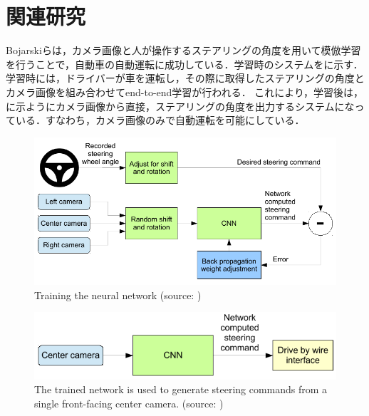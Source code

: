 
\section{関連研究}
     Bojarskiら\cite{bojarski}は，カメラ画像と人が操作するステアリングの角度を用いて模倣学習を行うことで，自動車の自動運転に成功している．学習時のシステムをに示す．学習時には，ドライバーが車を運転し，その際に取得したステアリングの角度とカメラ画像を組み合わせてend-to-end学習が行われる．
     これにより，学習後は，に示ようにカメラ画像から直接，ステアリングの角度を出力するシステムになっている．すなわち，カメラ画像のみで自動運転を可能にしている．
     
     \vspace{0.5cm}

     \begin{figure}[h]
          \centering
          \includegraphics[keepaspectratio, scale=1.0] {images/pdf/bojarski_train}
          \caption[Training the neural network]{Training the neural network (source: \cite{bojarski})}
          \label{Fig:bojarski_train}
     \end{figure}



     \begin{figure}[h]
          \centering
          \includegraphics[keepaspectratio, scale=1.10] {images/pdf/bojarski_test}
          \captionsetup{justification=raggedright} %
          \caption[The trained network is used to generate steering commands from a single front-facing center camera.]{The trained network is used to generate steering commands from a single front-facing center camera. (source: \cite{bojarski})}
          \label{Fig:bojarski_test}
     \end{figure}

